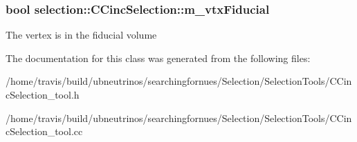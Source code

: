 \subsubsection[{\texorpdfstring{m\+\_\+vtx\+Fiducial}{m_vtxFiducial}}]{\setlength{\rightskip}{0pt plus 5cm}bool selection\+::\+C\+Cinc\+Selection\+::m\+\_\+vtx\+Fiducial\hspace{0.3cm}{\ttfamily [private]}}\hypertarget{classselection_1_1CCincSelection_a0f08b768b994a2b2798a54a1b11cfaef}{}\label{classselection_1_1CCincSelection_a0f08b768b994a2b2798a54a1b11cfaef}
The vertex is in the fiducial volume 

The documentation for this class was generated from the following files\+:\begin{DoxyCompactItemize}
\item 
/home/travis/build/ubneutrinos/searchingfornues/\+Selection/\+Selection\+Tools/C\+Cinc\+Selection\+\_\+tool.\+h\item 
/home/travis/build/ubneutrinos/searchingfornues/\+Selection/\+Selection\+Tools/C\+Cinc\+Selection\+\_\+tool.\+cc\end{DoxyCompactItemize}
